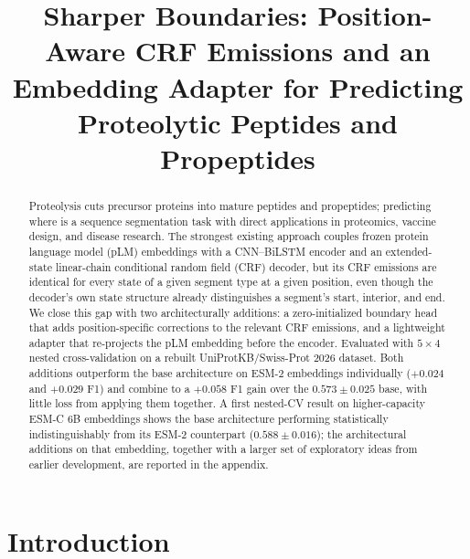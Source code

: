 \documentclass{article}
\begin{document}
\title{Sharper Boundaries: Position-Aware CRF Emissions and an Embedding
Adapter for Predicting Proteolytic Peptides and Propeptides}

\maketitle

\begin{abstract}

Proteolysis cuts precursor proteins into mature peptides and propeptides; predicting where is a sequence segmentation task with direct applications in proteomics, vaccine design, and disease research. The strongest existing approach couples frozen protein language model (pLM) embeddings with a CNN--BiLSTM encoder and an extended-state linear-chain conditional random field (CRF) decoder, but its CRF emissions are identical for every state of a given segment type at a given position, even though the decoder's own state structure already distinguishes a segment's start, interior, and end. We close this gap with two architecturally additions: a zero-initialized boundary head that adds position-specific corrections to the relevant CRF emissions, and a lightweight adapter that re-projects the pLM embedding before the encoder. Evaluated with $5\times4$ nested cross-validation on a rebuilt UniProtKB/Swiss-Prot 2026 dataset. Both additions outperform the base architecture on ESM-2 embeddings individually ($+0.024$ and $+0.029$ F1) and combine to a $+0.058$ F1 gain over the $0.573\pm0.025$ base, with little loss from applying them together. A first nested-CV result on higher-capacity ESM-C 6B embeddings shows the base architecture performing statistically indistinguishably from its ESM-2 counterpart ($0.588\pm0.016$); the architectural additions on that embedding, together with a larger set of exploratory ideas from earlier development, are reported in the appendix.
\end{abstract}

\section{Introduction}
\label{sec:intro}

\end{document}
